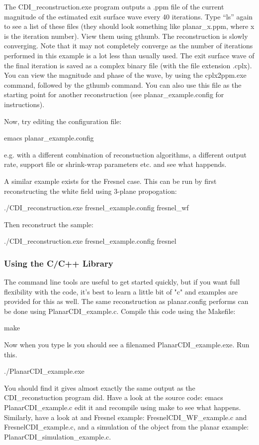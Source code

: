 \documentclass[]{cxs-software}
\begin{document}
The CDI\_reconstruction.exe program outputs a .ppm file of the current
magnitude of the estimated exit surface wave every 40 iterations. Type
``ls'' again to see a list of these files (they should look something like
planar\_x.ppm, where x is the iteration number). View them using
gthumb. The reconstruction is slowly converging. Note that it may not
completely converge as the number of iterations performed in this
example is a lot less than usually used. The exit surface wave of the
final iteration is saved as a complex binary file (with the file
extension .cplx). You can view the magnitude and phase of the wave, by
using the cplx2ppm.exe command, followed by the gthumb command. You
can also use this file as the starting point for another
reconstruction (see planar\_example.config for instructions).

Now, try editing the configuration file: 
\begin{myverbatim}
   emacs planar_example.config 
\end{myverbatim}
e.g. with a different combination of reconstuction algorithms, a
different output rate, support file or shrink-wrap parameters etc. and
see what happends.

A similar example exists for the Fresnel case. This can be run by
first reconstructing the white field using 3-plane propogation:
\begin{myverbatim}
   ./CDI_reconstruction.exe fresnel_example.config fresnel_wf 
\end{myverbatim}
Then reconstruct the sample: 
\begin{myverbatim}
   ./CDI_reconstruction.exe fresnel_example.config fresnel
\end{myverbatim}

\subsubsection{Using the C/C++ Library}

The command line tools are useful to get started quickly, but if you
want full flexibility with the code, it's best to learn a little bit
of "c" and examples are provided for this as well. The same
reconstruction as planar.config performs can be done using
PlanarCDI\_example.c. Compile this code using the Makefile: 
\begin{myverbatim}
   make 
\end{myverbatim}
Now when you type ls you should see a filenamed PlanarCDI\_example.exe. Run this.
\begin{myverbatim}
   ./PlanarCDI_example.exe 
\end{myverbatim}
You should find it gives almost exactly the same output as the
CDI\_reconstuction program did. Have a look at the source code: emacs
PlanarCDI\_example.c edit it and recompile using make to see what
happens. Similarly, have a look at and Fresnel example:
FresnelCDI\_WF\_example.c and FresnelCDI\_example.c, and a simulation of
the object from the planar example: PlanarCDI\_simulation\_example.c.
\end{document}
